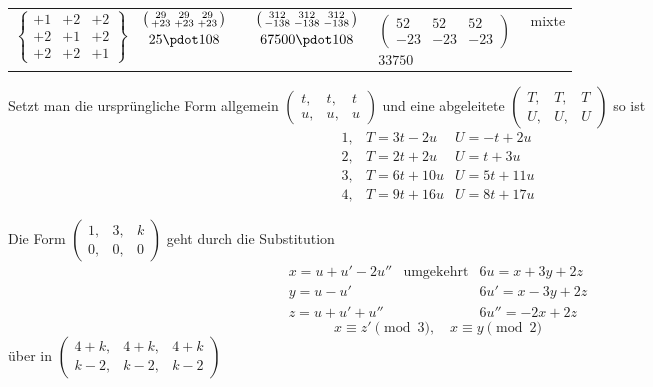 \begin{center}
\begin{tabular}{ccccc l}
$\left\{\begin{smallmatrix}+1&+2&+2\\+2&+1&+2\\+2&+2&+1\end{smallmatrix}\right\}$&
$\begin{gathered}\left(\begin{smallmatrix}29&29&29\\+23&+23&+23\end{smallmatrix}\right)\\25\pdot108\end{gathered}$&&
$\begin{gathered}\left(\begin{smallmatrix}312&312&312\\-138&-138&-138\end{smallmatrix}\right)\\67500\pdot108\end{gathered}$&
$\begin{gathered}\left(\begin{smallmatrix}52&52&52\\-23&-23&-23\end{smallmatrix}\right)\\33750\end{gathered}$&mixte
\end{tabular}\end{center}

Setzt man die ursprüngliche Form allgemein $\left(\begin{smallmatrix}t,&t,&t\\u,&u,&u\end{smallmatrix}\right)$ und eine abgeleitete $\left(\begin{smallmatrix}T,&T,&T\\U,&U,&U\end{smallmatrix}\right)$ so ist
\[
\begin{array}{rll}
1,&T=3t-2u&U=-t+2u\\
2,&T=2t+2u&U=t+3u\\
3,&T=6t+10u&U=5t+11u\\
4,&T=9t+16u&U=8t+17u
\end{array}
\]

Die Form $\left(\begin{smallmatrix}1,&3,&k\\0,&0,&0\end{smallmatrix}\right)$ geht durch die Substitution
\[
\begin{array}{lll}
x=u+u'-2u''&\text{umgekehrt}&6u=x+3y+2z\\
y=u-u'&&6u'=x-3y+2z\\
z=u+u'+u''&&6u''=-2x+2z
\end{array}
\]
\[
x\equiv z'\pmod3,\quad x\equiv y\pmod2
\]
über in $\left(\begin{smallmatrix}4+k,&4+k,&4+k\\k-2,&k-2,&k-2\end{smallmatrix}\right)$

